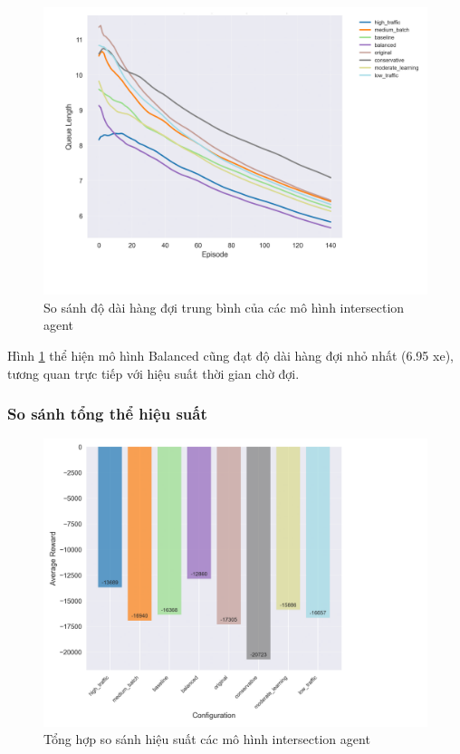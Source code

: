 \begin{figure}[!htp]
    \centering
    \includegraphics[width=\textwidth]{figures/individual_plots/intersection_filtered_queue_length.png}
    \caption{So sánh độ dài hàng đợi trung bình của các mô hình intersection agent}
    \label{fig:intersection_filtered_queue_length}
\end{figure}

Hình \ref{fig:intersection_filtered_queue_length} thể hiện mô hình Balanced cũng
đạt độ dài hàng đợi nhỏ nhất (6.95 xe), tương quan trực tiếp với hiệu suất thời
gian chờ đợi.

\subsubsection{So sánh tổng thể hiệu suất}

\begin{figure}[!htp]
    \centering
    \includegraphics[width=\textwidth]{
        figures/individual_plots/intersection_filtered_performance_summary.png
    }
    \caption{Tổng hợp so sánh hiệu suất các mô hình intersection agent}
    \label{fig:intersection_filtered_performance_summary}
\end{figure}

